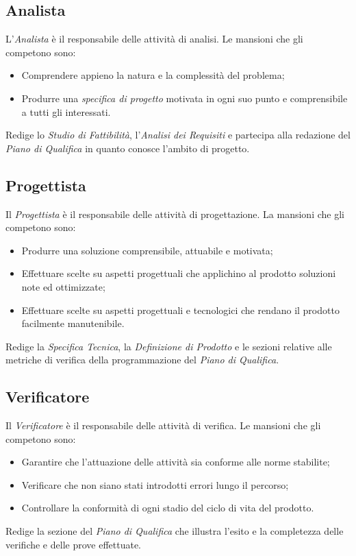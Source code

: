\subsection{Analista}
L'\textit{Analista} è il responsabile delle attività di analisi. Le mansioni che gli competono sono:
\begin{itemize}
	\item Comprendere appieno la natura e la complessità del problema;
	\item Produrre una \textit{specifica di progetto} motivata in ogni suo punto e comprensibile a tutti gli interessati.
\end{itemize}
Redige lo \textit{Studio di Fattibilità}, l'\textit{Analisi dei Requisiti} e partecipa alla redazione del \textit{Piano di Qualifica} in quanto conosce l'ambito di progetto.

\subsection{Progettista}
Il \textit{Progettista} è il responsabile delle attività di progettazione. La mansioni che gli competono sono:
\begin{itemize}
	\item Produrre una soluzione comprensibile, attuabile e motivata;
	\item Effettuare scelte su aspetti progettuali che applichino al prodotto soluzioni note ed ottimizzate;
	\item Effettuare scelte su aspetti progettuali e tecnologici che rendano il prodotto facilmente manutenibile.
\end{itemize}
Redige la \textit{Specifica Tecnica}, la \textit{Definizione di Prodotto} e le sezioni relative alle metriche di verifica della programmazione del \textit{Piano di Qualifica}.

\subsection{Verificatore}
Il \textit{Verificatore} è il responsabile delle attività di verifica. Le mansioni che gli competono sono:
\begin{itemize}
	\item Garantire che l'attuazione delle attività sia conforme alle norme stabilite;
	\item Verificare che non siano stati introdotti errori lungo il percorso;
	\item Controllare la conformità di ogni stadio del ciclo di vita del prodotto.
\end{itemize}
Redige la sezione del \textit{Piano di Qualifica} che illustra l'esito e la completezza delle verifiche
e delle prove effettuate.

